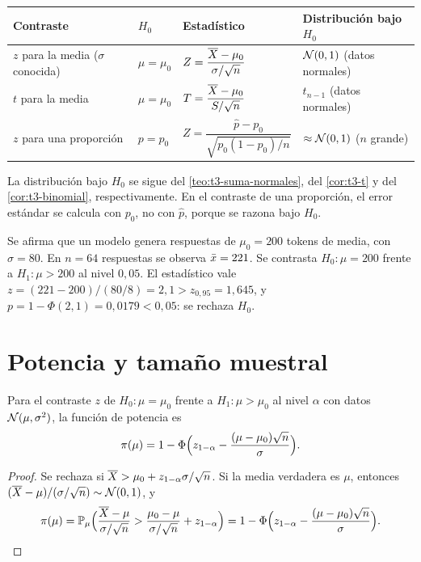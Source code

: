 \begin{center}
\small
\begin{tabular}{@{}llll@{}}
\toprule
Contraste & $H_0$ & Estadístico & Distribución bajo $H_0$ \\
\midrule
$z$ para la media ($\sigma$ conocida) & $\mu=\mu_0$ & $Z=\dfrac{\overline{X}-\mu_0}{\sigma/\sqrt n}$ & $\mathcal{N}(0,1)$ (datos normales) \\[2ex]
$t$ para la media & $\mu=\mu_0$ & $T=\dfrac{\overline{X}-\mu_0}{S/\sqrt n}$ & $t_{n-1}$ (datos normales) \\[2ex]
$z$ para una proporción & $p=p_0$ & $Z=\dfrac{\widehat p-p_0}{\sqrt{p_0(1-p_0)/n}}$ & $\approx\mathcal{N}(0,1)$ ($n$ grande) \\
\bottomrule
\end{tabular}
\end{center}

La distribución bajo $H_0$ se sigue del \cref{teo:t3-suma-normales}, del \cref{cor:t3-t} y del \cref{cor:t3-binomial}, respectivamente. En el contraste de una proporción, el error estándar se calcula con $p_0$, no con $\widehat p$, porque se razona bajo $H_0$.

\begin{ejemplo}\label{ej:t5-z}
Se afirma que un modelo genera respuestas de $\mu_0=200$ tokens de media, con $\sigma=80$. En $n=64$ respuestas se observa $\bar{x}=221$. Se contrasta $H_0:\mu=200$ frente a $H_1:\mu>200$ al nivel $0{,}05$. El estadístico vale $z=(221-200)/(80/8)=2{,}1>z_{0{,}95}=1{,}645$, y $p=1-\Phi(2{,}1)=0{,}0179<0{,}05$: se rechaza $H_0$.
\end{ejemplo}

\section{Potencia y tamaño muestral}

\begin{proposicion}\label{prop:t5-potencia}
Para el contraste $z$ de $H_0:\mu=\mu_0$ frente a $H_1:\mu>\mu_0$ al nivel $\alpha$ con datos $\mathcal{N}(\mu,\sigma^{2})$, la función de potencia es
\[
\pi(\mu)=1-\Phi\Bigl(z_{1-\alpha}-\frac{(\mu-\mu_0)\sqrt n}{\sigma}\Bigr).
\]
\end{proposicion}

\begin{proof}
Se rechaza si $\overline{X}>\mu_0+z_{1-\alpha}\sigma/\sqrt n$. Si la media verdadera es $\mu$, entonces $(\overline{X}-\mu)/(\sigma/\sqrt n)\sim\mathcal{N}(0,1)$, y
\[
\pi(\mu)=\mathbb{P}_\mu\Bigl(\frac{\overline{X}-\mu}{\sigma/\sqrt n}>\frac{\mu_0-\mu}{\sigma/\sqrt n}+z_{1-\alpha}\Bigr)=1-\Phi\Bigl(z_{1-\alpha}-\frac{(\mu-\mu_0)\sqrt n}{\sigma}\Bigr).\qedhere
\]
\end{proof}

